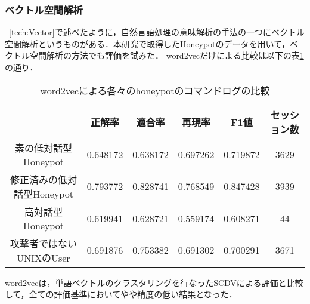 \subsubsection{ベクトル空間解析}
~\ref{tech:Vector}で述べたように，自然言語処理の意味解析の手法の一つにベクトル空間解析というものがある．本研究で取得したHoneypotのデータを用いて，ベクトル空間解析の方法でも評価を試みた．
word2vecだけによる比較は以下の表\ref{table:word2veccompare}の通り．
\clearpage
\vspace{3mm}
\setlength{\myheighta}{10mm}
\begin{table}[h]
 \caption{word2vecによる各々のhoneypotのコマンドログの比較}
 \label{table:word2veccompare}
 \centering
  \begin{tabular}{|c||c|c|c|c|c|}
   \hline
   \parbox[c][\myheighta][c]{0cm}{}  & 正解率 & 適合率 & 再現率 & F1値 & セッション数\\
   \hline \hline 
     \parbox[c][\myheighta][c]{0cm}{} 素の低対話型Honeypot  & 0.648172 & 0.638172 & 0.697262 & 0.719872 & 3629\\
     \hline
     \parbox[c][\myheighta][c]{0cm}{} 修正済みの低対話型Honeypot  & 0.793772 & 0.828741 & 0.768549 & 0.847428 & 3939\\
     \hline
     \parbox[c][\myheighta][c]{0cm}{} 高対話型Honeypot  & 0.619941 & 0.628721 & 0.559174 & 0.608271 & 44\\
     \hline
     \parbox[c][\myheighta][c]{0cm}{} 攻撃者ではないUNIXのUser & 0.691876 & 0.753382 & 0.691302 & 0.700291& 3671\\
     \hline
  \end{tabular}
\end{table}
\vspace{7mm}
word2vecは，単語ベクトルのクラスタリングを行なったSCDVによる評価と比較して，全ての評価基準においてやや精度の低い結果となった．\\

